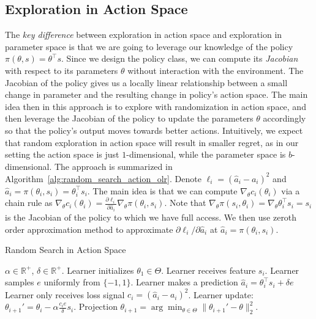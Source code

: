 \subsection{Exploration in Action Space}
The \emph{key difference} between exploration in action space and exploration in parameter space is that we are going to leverage our knowledge of the policy $\pi(\theta, s) = \theta^{\top} s$. Since we design the policy class, we can compute its \emph{Jacobian} with respect to its parameters $\theta$ without interaction with the environment. The Jacobian of the policy gives us a locally linear relationship between a small change in parameter and the resulting change in policy's action space. The main idea then in this approach is to explore with randomization in action space, and then leverage the Jacobian of the policy to update the parameters $\theta$ accordingly so that the policy's output moves towards better actions. Intuitively, we expect that random exploration in action space will result in smaller regret, as in our setting the action space is just $1$-dimensional, while the parameter space is $b$-dimensional.  %
The approach is summarized in Algorithm~\ref{alg:random_search_action_olr}. Denote $\ell_i = (\hat{a}_i - a_i)^2$ and $\hat{a}_i = \pi(\theta_i, s_i) = \theta_i^{\top}s_i$. The main idea is that we can compute $\nabla_{\theta} c_i(\theta_i)$ via a chain rule as $\nabla_{\theta} c_i (\theta_i) = \frac{\partial{\ell_i}}{\partial{\hat{a}_i}}\nabla_{\theta}\pi(\theta_i, s_i)$. Note that $\nabla_{\theta}\pi(s_i, \theta_i) = \nabla_\theta \theta_i^{\top}s_i = s_i$ is the Jacobian of the policy to which we have full access. We then use zeroth order approximation method to approximate $\partial{\ell_i}/\partial{\hat{a}_i}$ at $\hat{a}_i = \pi(\theta_i, s_i)$.


\begin{algorithm}[ht]
\caption{Random Search in Action Space}
 \label{alg:random_search_action_olr}
\begin{algorithmic}[1]
   $\alpha\in\mathbb{R}^+$, $\delta\in\mathbb{R}^+$.
  \State Learner initializes $\theta_1\in\Theta$.
    \State Learner receives feature $s_i$.
    \State Learner samples $e$ uniformly from $\{-1,1\}$.
    \State Learner makes a prediction $\hat{a}_i = \theta_i^{\top} s_i + \delta e$
    \State Learner only receives loss signal $c_i = (\hat{a}_i - a_i)^2$. %
    \State Learner update: $\theta_{i+1}' = \theta_i - \alpha \frac{c_i e}{\delta}s_i$.
    \State Projection $\theta_{i+1} = \arg\min_{\theta\in{\Theta}}\|\theta_{i+1}'-\theta\|_2^2$.
  \EndFor
\end{algorithmic}
\end{algorithm}


